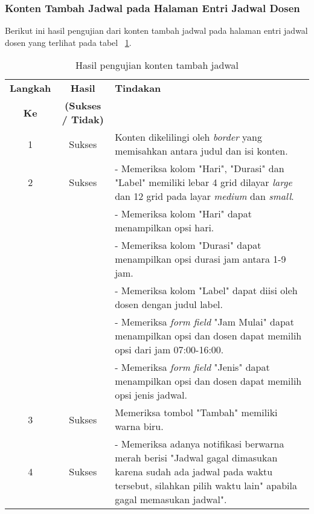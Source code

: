 \subsubsection{Konten Tambah Jadwal pada Halaman Entri Jadwal Dosen}
Berikut ini hasil pengujian dari konten tambah jadwal pada halaman entri jadwal dosen yang terlihat pada tabel ~\ref{hasil:TambahJadwal}.
\begin{table}[H]
	\centering 
	\caption{Hasil pengujian konten tambah jadwal}
	\label{hasil:TambahJadwal}
	\begin{tabular}{|c| c| p{}|}
		\toprule
		\textbf{Langkah} & \textbf{Hasil} & \textbf{Tindakan}\\
		\textbf{Ke} & \textbf{(Sukses / Tidak)} &\\
		\midrule
		1&Sukses&Konten dikelilingi oleh \textit{border} yang memisahkan antara judul dan isi konten.\\
		\hline
		2&Sukses& - Memeriksa kolom "Hari", "Durasi" dan "Label" memiliki lebar 4 grid dilayar \textit{large} dan 12 grid pada layar \textit{medium} dan \textit{small}.\\
		&& - Memeriksa kolom "Hari" dapat menampilkan opsi hari.\\
		&& - Memeriksa kolom "Durasi" dapat menampilkan opsi durasi jam antara 1-9 jam.\\
		&& - Memeriksa kolom "Label" dapat diisi oleh dosen dengan judul label.\\
		&& - Memeriksa \textit{form field} "Jam Mulai" dapat menampilkan opsi dan dosen dapat memilih opsi dari jam 07:00-16:00.\\
		&& - Memeriksa \textit{form field} "Jenis" dapat menampilkan opsi dan dosen dapat memilih opsi jenis jadwal.\\
		\hline
		3&Sukses&Memeriksa tombol "Tambah" memiliki warna biru.\\
		\hline
		4&Sukses& - Memeriksa adanya notifikasi berwarna merah berisi "Jadwal gagal dimasukan karena sudah ada jadwal pada waktu tersebut, silahkan pilih waktu lain" apabila gagal memasukan jadwal".\\		
		\bottomrule		
	\end{tabular} 
\end{table}

